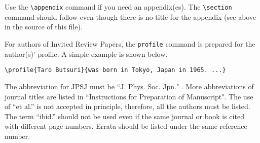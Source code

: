\documentclass[letter,twocolumn]{jpsj3}
\begin{document}
\appendix
\section{}

Use the \verb|\appendix| command if you need an appendix(es). The \verb|\section| command should follow even though there is no title for the appendix (see above in the source of this file).

For authors of Invited Review Papers, the \verb|profile| command is prepared for the author(s)' profile.  A simple example is shown below.

\begin{verbatim}
\profile{Taro Butsuri}{was born in Tokyo, Japan in 1965. ...}
\end{verbatim}

\begin{thebibliography}{9}
 The abbreviation for JPSJ must be ``J. Phys. Soc. Jpn." .
 More abbreviations of journal titles are listed in ``Instructions for Preparation of Manuscript".
 The use of ``et al.'' is not accepted in principle, therefore, all the authors must be listed.
 The term ``ibid.'' should not be used even if the same journal or book is cited with different page numbers.
 Errata should be listed under the same reference number. 
\end{thebibliography}
\end{document}
